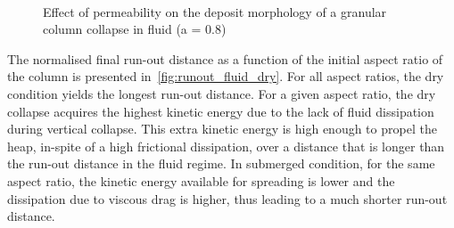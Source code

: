 \begin{figure}
\\
\caption{Effect of permeability on the deposit morphology of a granular column 
collapse in fluid (a = 0.8)}
\label{fig:a08_dense_snapshots}
\end{figure}

The normalised final run-out distance as a function of the initial aspect ratio 
of the column is presented in~\cref{fig:runout_fluid_dry}. For all aspect 
ratios, the dry condition yields the longest run-out distance. For a given 
aspect ratio, the dry collapse acquires the highest kinetic energy due to 
the lack of fluid dissipation during vertical collapse. This extra kinetic 
energy is high enough to propel the heap, in-spite of a high frictional 
dissipation, over a distance that is longer than the run-out distance in 
the fluid regime. In submerged condition, for the same aspect ratio, 
the kinetic energy available for spreading is lower and the dissipation 
due to viscous drag is higher, thus leading to a much shorter run-out
distance. 

